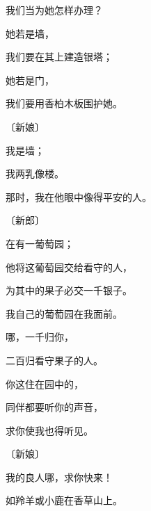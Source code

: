 {\par }{\Q 我们当为她怎样办理？
\par }{\Q {}她若是墙，
\par }{\Q 我们要在其上建造银塔；
\par }{\Q 她若是门，
\par }{\Q 我们要用香柏木板围护她。
\par }{\SP 〔新娘〕
\par }{\Q {}我是墙；
\par }{\Q 我两乳像{}楼。
\par }{\Q 那时，我在他眼中像得平安的人。
\par }{\SP 〔新郎〕
\par }{\Q {}在{}有一葡萄园；
\par }{\Q 他将这葡萄园交给看守的人，
\par }{\Q 为其中的果子必交一千{}银子。
\par }{\Q {}我自己的葡萄园在我面前。
\par }{哪，一千{}归你，
\par }{\Q 二百{}归看守果子的人。
\par }{\Q {}你这住在园中的，
\par }{\Q 同伴都要听你的声音，
\par }{\Q 求你使我也得听见。
\par }{\SP 〔新娘〕
\par }{\Q {}我的良人哪，求你快来！
\par }{\Q 如羚羊或小鹿在香草山上。
\par }